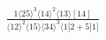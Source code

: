 \documentclass[varwidth, border=5pt]{standalone}
\begin{document}
\begin{my}
$\begin{gathered}
\scriptscriptstyle\frac{1⟨25⟩^3⟨14⟩^2⟨13⟩[14]}{⟨12⟩^2⟨15⟩⟨34⟩^3⟨1|2+5|1]}
\end{gathered}$
\end{my}
\end{document}
